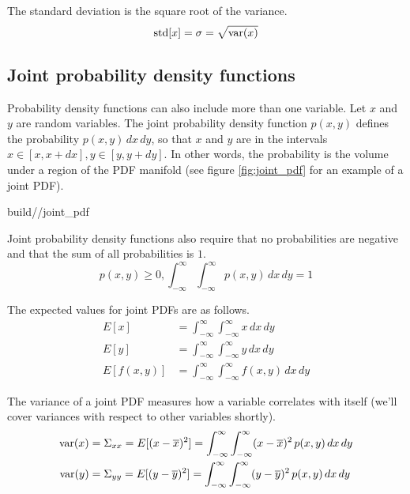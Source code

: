 The standard deviation is the square root of the variance.
\begin{equation*}
  \operatorname{std}[x] = \sigma = \sqrt{\operatorname{var}(x)}
\end{equation*}

\subsection{Joint probability density functions}

Probability density functions can also include more than one variable. Let $x$
and $y$ are random variables. The joint probability density function $p(x, y)$
defines the probability $p(x, y) \,dx \,dy$, so that $x$ and $y$ are in the
intervals $x \in [x, x + dx], y \in [y, y + dy]$. In other words, the
probability is the volume under a region of the PDF manifold (see figure
\ref{fig:joint_pdf} for an example of a joint PDF).
\begin{svg}{build/\chapterpath/joint_pdf}
  \caption{Joint probability density function}
  \label{fig:joint_pdf}
\end{svg}

Joint probability density functions also require that no probabilities are
negative and that the sum of all probabilities is $1$.
\begin{equation*}
  p(x, y) \geq 0, \int_{-\infty}^\infty \int_{-\infty}^{\infty} p(x, y) \,dx
    \,dy = 1
\end{equation*}

The expected values for joint PDFs are as follows.
\begin{align*}
  E[x] &= \int_{-\infty}^\infty \int_{-\infty}^{\infty} x \,dx \,dy \\
  E[y] &= \int_{-\infty}^\infty \int_{-\infty}^{\infty} y \,dx \,dy \\
  E[f(x, y)] &= \int_{-\infty}^\infty \int_{-\infty}^{\infty} f(x, y) \,dx \,dy
\end{align*}

The variance of a joint PDF measures how a variable correlates with itself
(we'll cover variances with respect to other variables shortly).
\begin{align*}
  \operatorname{var}(x) &= \Sigma_{xx} = E[(x - \overline{x})^2] =
    \int_{-\infty}^\infty \int_{-\infty}^\infty (x - \overline{x})^2 \,p(x, y)
    \,dx \,dy \\
  \operatorname{var}(y) &= \Sigma_{yy} = E[(y - \overline{y})^2] =
    \int_{-\infty}^\infty \int_{-\infty}^\infty (y - \overline{y})^2 \,p(x, y)
    \,dx \,dy \\
\end{align*}

